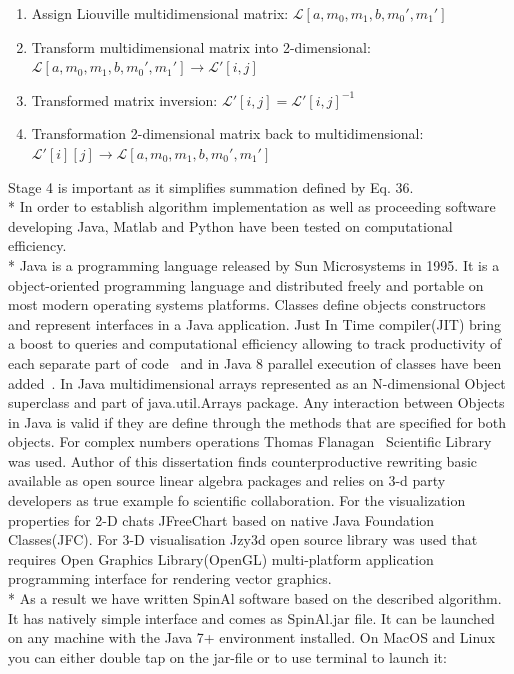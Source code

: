 \begin{center}
\begin{enumerate}
\item Assign Liouville multidimensional matrix: $\mathcal{L}[a,m_0,m_1,b,m_0',m_1']$
\item Transform multidimensional matrix into 2-dimensional: $\mathcal{L}[a,m_0,m_1,b,m_0',m_1'] \rightarrow \mathcal{L}'[i,j]$ 
\item Transformed matrix inversion: $\mathcal{L}'[i,j]=\mathcal{L}'[i,j]^{-1}$
\item Transformation 2-dimensional matrix back to multidimensional: \\ $\mathcal{L}'[i][j]\rightarrow \mathcal{L}[a,m_0,m_1,b,m_0',m_1']$ 
\end{enumerate}   
\end{center}   	
Stage 4 is important as it simplifies summation defined by Eq. 36. \\*
In order to establish algorithm implementation as well as proceeding software developing Java, Matlab and Python have been tested on computational efficiency. \\*
Java is  a programming language released by Sun Microsystems in 1995. It is a object-oriented programming language and distributed freely and portable on most modern operating systems platforms. Classes define objects constructors and represent interfaces in a Java application. Just In Time compiler(JIT) bring a boost to queries and computational efficiency allowing to track productivity of each separate part of code~\cite{hortell} and in Java 8 parallel execution of classes have been added~\cite{javapal}. In Java multidimensional arrays represented as an N-dimensional Object superclass and part of java.util.Arrays package. Any interaction between Objects in Java is valid if they are define through the methods that are specified for both objects. For complex numbers operations Thomas Flanagan~\cite{flanagan} Scientific Library was used. Author of this dissertation finds counterproductive rewriting basic available as open source linear algebra packages and relies on 3-d party developers as true example fo scientific collaboration. For the visualization properties for 2-D chats JFreeChart based on native Java Foundation Classes(JFC). For 3-D visualisation Jzy3d open source library was used that requires Open Graphics Library(OpenGL)  multi-platform application programming interface for rendering vector graphics.\\*
As a result we have written SpinAl software based on the described algorithm. It has natively simple interface and comes as SpinAl.jar file. It can be launched on any machine with the Java 7+ environment installed. On MacOS and Linux you can either double tap on the jar-file or to use terminal to launch it:
